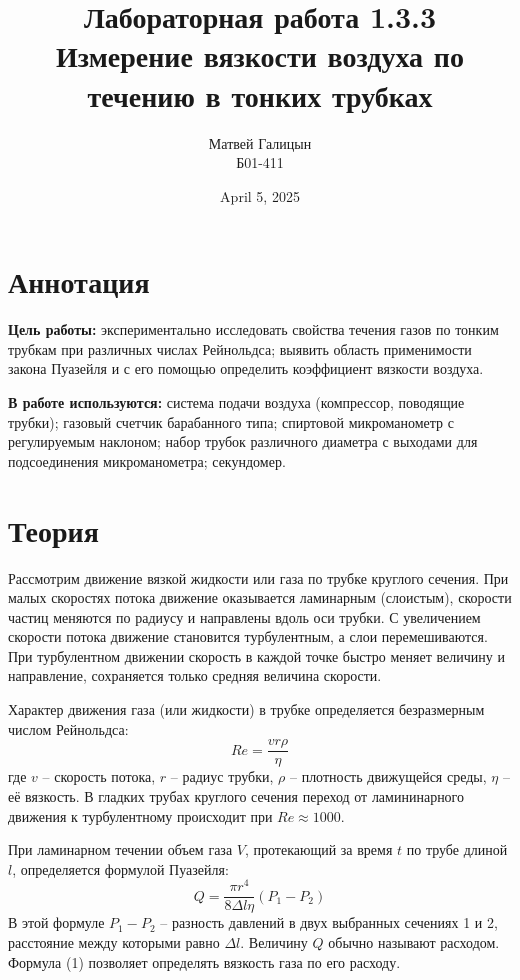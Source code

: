 \documentclass[a4paper, 10pt, twocolumn]{article}
\title{Лабораторная работа 1.3.3 \\ Измерение вязкости воздуха по течению в тонких трубках}
\author{Матвей Галицын \\ Б01-411}
\date{April 5, 2025}
\begin{document}
\maketitle
\newpage{}
\section{Аннотация}
\textbf{Цель работы:} экспериментально исследовать свойства течения газов по тонким трубкам при различных числах Рейнольдса; выявить область применимости закона Пуазейля и с его помощью определить коэффициент вязкости воздуха.\par
	
\textbf{В работе используются:} система подачи воздуха (компрессор, поводящие трубки); газовый счетчик барабанного типа; спиртовой микроманометр с регулируемым наклоном; набор трубок различного диаметра с выходами для подсоединения микроманометра; секундомер.

\section{Теория}
    Рассмотрим движение вязкой жидкости или газа по трубке круглого сечения. При малых скоростях потока движение оказывается ламинарным (слоистым), скорости частиц меняются по радиусу и направлены вдоль оси трубки. С увеличением скорости потока движение становится турбулентным, а слои перемешиваются. При турбулентном движении скорость в каждой точке быстро меняет величину и направление, сохраняется только средняя величина скорости.

    Характер движения газа (или жидкости) в трубке определяется безразмерным числом Рейнольдса:
    \[
        Re = \frac{vr\rho}{\eta}
    \]
    где $v$ -- скорость потока, $r$ -- радиус трубки, $\rho$ -- плотность движущейся среды, $\eta$ -- её вязкость. В гладких трубах круглого сечения переход от ламининарного движения к турбулентному происходит при $Re \approx 1000$.

    При ламинарном течении объем газа $V$, протекающий за время $t$ по трубе длиной $l$, определяется формулой Пуазейля:
    \begin{equation}
        Q = \frac{\pi r^4}{8 \Delta l \eta}(P_1 - P_2)
    \end{equation}
    В этой формуле $P_1 - P_2$ -- разность давлений в двух выбранных сечениях 1 и 2, расстояние между которыми равно $\Delta l$. Величину $Q$ обычно называют расходом. Формула (1) позволяет определять вязкость газа по его расходу.
\end{document}
